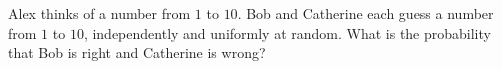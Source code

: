 Alex thinks of a number from $1$ to $10$. Bob and Catherine each guess a number from $1$ to $10$, independently and uniformly at random. What is the probability that Bob is right and Catherine is wrong?

